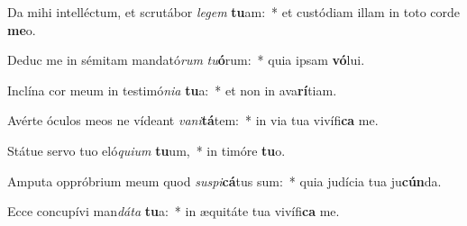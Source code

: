 \item Da mihi intelléctum, et scrutábor \textit{le}\textit{gem} \textbf{tu}am:~* et custódiam illam in toto corde \textbf{me}o.
\item Deduc me in sémitam mandató\textit{rum} \textit{tu}\textbf{ó}rum:~* quia ipsam \textbf{vó}lui.
\item Inclína cor meum in testimó\textit{ni}\textit{a} \textbf{tu}a:~* et non in ava\textbf{rí}tiam.
\item Avérte óculos meos ne vídeant \textit{va}\textit{ni}\textbf{tá}tem:~* in via tua vivífi\textbf{ca} me.
\item Státue servo tuo eló\textit{qui}\textit{um} \textbf{tu}um,~* in timóre \textbf{tu}o.
\item Amputa oppróbrium meum quod \textit{su}\textit{spi}\textbf{cá}tus sum:~* quia judícia tua ju\textbf{cún}da.
\item Ecce concupívi man\textit{dá}\textit{ta} \textbf{tu}a:~* in æquitáte tua vivífi\textbf{ca} me.
